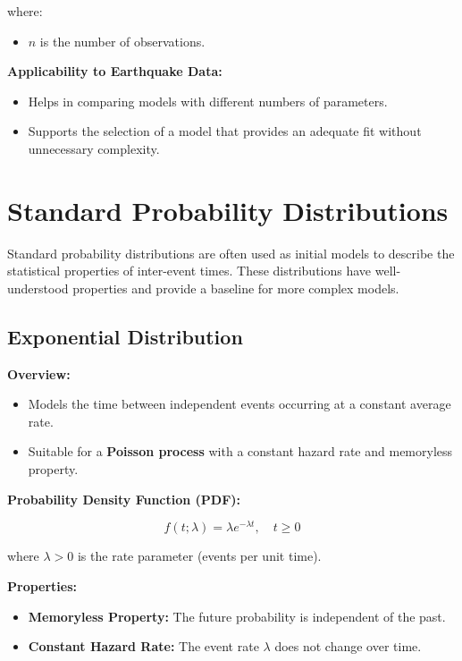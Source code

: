 \documentclass{article}
\begin{document}
where:

\begin{itemize}
    \item $n$ is the number of observations.
\end{itemize}

\textbf{Applicability to Earthquake Data:}

\begin{itemize}
    \item Helps in comparing models with different numbers of parameters.
    \item Supports the selection of a model that provides an adequate fit without unnecessary complexity.
\end{itemize}

\section{Standard Probability Distributions}

Standard probability distributions are often used as initial models to describe the statistical properties of inter-event times. These distributions have well-understood properties and provide a baseline for more complex models.

\subsection{Exponential Distribution}

\textbf{Overview:}

\begin{itemize}
    \item Models the time between independent events occurring at a constant average rate.
    \item Suitable for a \textbf{Poisson process} with a constant hazard rate and memoryless property.
\end{itemize}

\textbf{Probability Density Function (PDF):}

\[
f(t; \lambda) = \lambda e^{-\lambda t}, \quad t \geq 0
\]

where $\lambda > 0$ is the rate parameter (events per unit time).

\textbf{Properties:}

\begin{itemize}
    \item \textbf{Memoryless Property:} The future probability is independent of the past.
    \item \textbf{Constant Hazard Rate:} The event rate $\lambda$ does not change over time.
\end{itemize}
\end{document}
